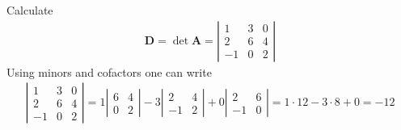\begin{myExample}
	Calculate
	\begin{eqnarray}
		\mathbf{D}=\det\mathbf{A}=
		\left|
		\begin{matrix}
			1 & 3 & 0\\
			2 & 6 & 4\\
			-1 & 0 &2
		\end{matrix}
		\right|
	\end{eqnarray}
	Using minors and cofactors one can write
	\begin{eqnarray*}
		\left|
		\begin{matrix}
			1 & 3 & 0\\
			2 & 6 & 4\\
			-1 & 0 &2
		\end{matrix}
		\right|
		=
		1
		\left|
		\begin{matrix}
			
			 6 & 4\\
			 0 &2
		\end{matrix}
		\right|
		-3
		\left|
		\begin{matrix}
		
			2  & 4\\
			-1  &2
		\end{matrix}
		\right|
		+0
		\left|
		\begin{matrix}
			
			2 & 6\\
			-1 & 0 
		\end{matrix}
		\right|
		=
		1\cdot12-3\cdot8+0=-12
	\end{eqnarray*}
\end{myExample}
